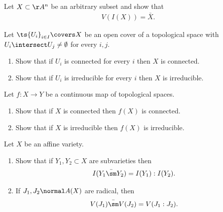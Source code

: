 \begin{exercise}[Gathmann 2.18]

Let \(X\subset \AA^n\) be an arbitrary subset and show that
\begin{align*}  
V(I(X)) = \bar{X}
.\end{align*}

\end{exercise}

\begin{exercise}[Gathmann 2.21]

Let \(\ts{U_i}_{i\in I} \covers X\) be an open cover of a topological
space with \(U_i \intersect U_j \neq \emptyset\) for every \(i, j\).

\begin{enumerate}
\def\labelenumi{\alph{enumi}.}
\item
  Show that if \(U_i\) is connected for every \(i\) then \(X\) is
  connected.
\item
  Show that if \(U_i\) is irreducible for every \(i\) then \(X\) is
  irreducible.
\end{enumerate}

\end{exercise}

\begin{exercise}[Gathmann 2.22]

Let \(f:X\to Y\) be a continuous map of topological spaces.

\begin{enumerate}
\def\labelenumi{\alph{enumi}.}
\item
  Show that if \(X\) is connected then \(f(X)\) is connected.
\item
  Show that if \(X\) is irreducible then \(f(X)\) is irreducible.
\end{enumerate}

\end{exercise}

\begin{exercise}[Gathmann 2.23]

Let \(X\) be an affine variety.

\begin{enumerate}
\def\labelenumi{\alph{enumi}.}
\item
  Show that if \(Y_1, Y_2 \subset X\) are subvarieties then
  \begin{align*}  
  I(\bar{Y_1\sm Y_2}) = I(Y_1): I(Y_2)
  .\end{align*}
\item
  If \(J_1, J_2 \normal A(X)\) are radical, then
  \begin{align*}  
  \bar{V(J_1) \sm V(J_2)} = V(J_1: J_2)
  .\end{align*}
\end{enumerate}

\end{exercise}

